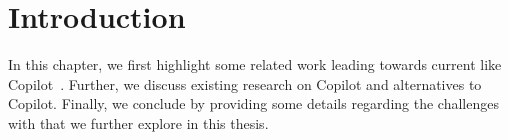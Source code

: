 \label{chapter:background}

\newlength{\savedunitlength}
\setlength{\unitlength}{2em}

\section{Introduction}
In this chapter, we first highlight some related work leading towards current \cct{} like Copilot~\cite{Copilot-web}. Further, we discuss existing research on Copilot and alternatives to Copilot. Finally, we conclude by providing some details regarding the challenges with \cct{} that we further explore in this thesis.







\setlength{\unitlength}{\savedunitlength}
